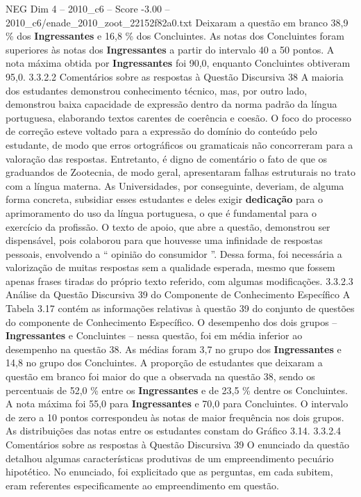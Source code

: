\begin{textsample}{NEG Dim 4 – 2010\_c6 – Score -3.00 – 2010\_c6/enade\_2010\_zoot\_22152f82a0.txt}
Deixaram a questão em branco 38,9 \% dos \textbf{Ingressantes} e 16,8 \% dos Concluintes.
As notas dos Concluintes foram superiores às notas dos \textbf{Ingressantes} a partir do intervalo 40 a 50 pontos.
A nota máxima obtida por \textbf{Ingressantes} foi 90,0, enquanto Concluintes obtiveram 95,0. 3.3.2.2 Comentários sobre as respostas à Questão Discursiva 38 A maioria dos estudantes demonstrou conhecimento técnico, mas, por outro lado, demonstrou baixa capacidade de expressão dentro da norma padrão da língua portuguesa, elaborando textos carentes de coerência e coesão.
O foco do processo de correção esteve voltado para a expressão do domínio do conteúdo pelo estudante, de modo que erros ortográficos ou gramaticais não concorreram para a valoração das respostas.
Entretanto, é digno de comentário o fato de que os graduandos de Zootecnia, de modo geral, apresentaram falhas estruturais no trato com a língua materna.
As Universidades, por conseguinte, deveriam, de alguma forma concreta, subsidiar esses estudantes e deles exigir \textbf{dedicação} para o aprimoramento do uso da língua portuguesa, o que é fundamental para o exercício da profissão.
O texto de apoio, que abre a questão, demonstrou ser dispensável, pois colaborou para que houvesse uma infinidade de respostas pessoais, envolvendo a “ opinião do consumidor ”.
Dessa forma, foi necessária a valorização de muitas respostas sem a qualidade esperada, mesmo que fossem apenas frases tiradas do próprio texto referido, com algumas modificações. 3.3.2.3 Análise da Questão Discursiva 39 do Componente de Conhecimento Específico A Tabela 3.17 contém as informações relativas à questão 39 do conjunto de questões do componente de Conhecimento Específico.
O desempenho dos dois grupos – \textbf{Ingressantes} e Concluintes – nessa questão, foi em média inferior ao desempenho na questão 38.
As médias foram 3,7 no grupo dos \textbf{Ingressantes} e 14,8 no grupo dos Concluintes.
A proporção de estudantes que deixaram a questão em branco foi maior do que a observada na questão 38, sendo os percentuais de 52,0 \% entre os \textbf{Ingressantes} e de 23,5 \% dentre os Concluintes.
A nota máxima foi 55,0 para \textbf{Ingressantes} e 70,0 para Concluintes.
O intervalo de zero a 10 pontos correspondeu às notas de maior frequência nos dois grupos.
As distribuições das notas entre os estudantes constam do Gráfico 3.14. 3.3.2.4 Comentários sobre as respostas à Questão Discursiva 39 O enunciado da questão detalhou algumas características produtivas de um empreendimento pecuário hipotético.
No enunciado, foi explicitado que as perguntas, em cada subitem, eram referentes especificamente ao empreendimento em questão.

\end{textsample}
